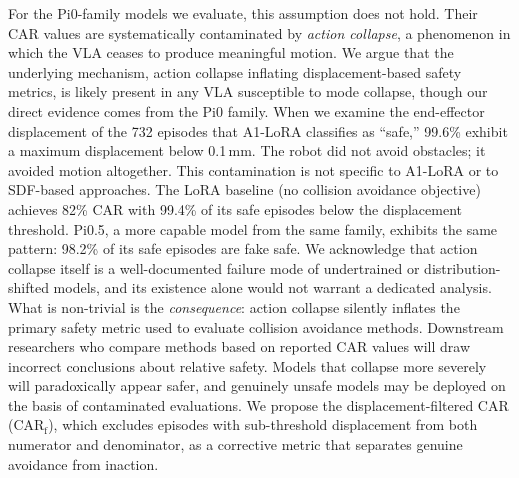 For the Pi0-family models we evaluate, this assumption does not hold. Their CAR values are systematically contaminated by \emph{action collapse}, a phenomenon in which the VLA ceases to produce meaningful motion. We argue that the underlying mechanism, action collapse inflating displacement-based safety metrics, is likely present in any VLA susceptible to mode collapse, though our direct evidence comes from the Pi0 family. When we examine the end-effector displacement of the 732 episodes that A1-LoRA classifies as ``safe,'' 99.6\% exhibit a maximum displacement below 0.1\,mm. The robot did not avoid obstacles; it avoided motion altogether. This contamination is not specific to A1-LoRA or to SDF-based approaches. The LoRA baseline (no collision avoidance objective) achieves 82\% CAR with 99.4\% of its safe episodes below the displacement threshold. Pi0.5, a more capable model from the same family, exhibits the same pattern: 98.2\% of its safe episodes are fake safe. We acknowledge that action collapse itself is a well-documented failure mode of undertrained or distribution-shifted models, and its existence alone would not warrant a dedicated analysis. What is non-trivial is the \emph{consequence}: action collapse silently inflates the primary safety metric used to evaluate collision avoidance methods. Downstream researchers who compare methods based on reported CAR values will draw incorrect conclusions about relative safety. Models that collapse more severely will paradoxically appear safer, and genuinely unsafe models may be deployed on the basis of contaminated evaluations. We propose the displacement-filtered CAR (CAR$_\text{f}$), which excludes episodes with sub-threshold displacement from both numerator and denominator, as a corrective metric that separates genuine avoidance from inaction.


